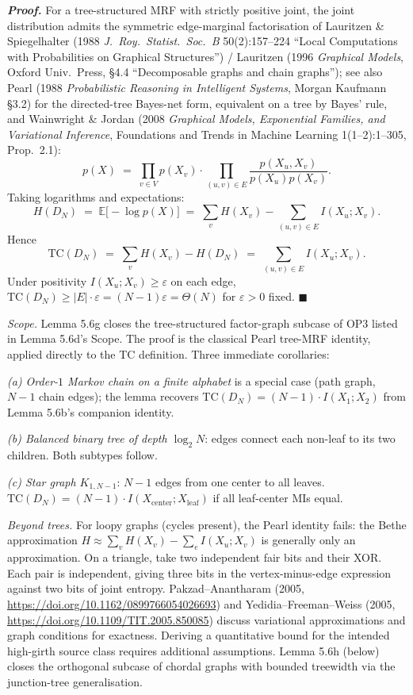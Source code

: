 \documentclass[
]{article}
\begin{document}
\emph{\textbf{Proof.}} For a tree-structured MRF with strictly
positive joint, the joint distribution admits the symmetric
edge-marginal factorisation of Lauritzen \& Spiegelhalter (1988
\emph{J.\ Roy.\ Statist.\ Soc.\ B} 50(2):157--224 ``Local Computations
with Probabilities on Graphical Structures'') / Lauritzen (1996
\emph{Graphical Models}, Oxford Univ.\ Press, §4.4 ``Decomposable
graphs and chain graphs''); see also Pearl (1988
\emph{Probabilistic Reasoning in Intelligent Systems}, Morgan
Kaufmann §3.2) for the directed-tree Bayes-net form, equivalent on
a tree by Bayes' rule, and Wainwright \& Jordan (2008
\emph{Graphical Models, Exponential Families, and Variational
Inference}, Foundations and Trends in Machine Learning
1(1--2):1--305, Prop.\ 2.1):
\[
p(X) \;=\; \prod_{v \in V} p(X_v) \cdot \prod_{(u, v) \in E}
\frac{p(X_u, X_v)}{p(X_u) p(X_v)}.
\]
Taking logarithms and expectations:
\[
H(D_N)
\;=\; \mathbb{E}\bigl[-\log p(X)\bigr]
\;=\; \sum_v H(X_v) - \sum_{(u, v) \in E} I(X_u; X_v).
\]
Hence
\[
\mathrm{TC}(D_N) \;=\; \sum_v H(X_v) - H(D_N)
\;=\; \sum_{(u, v) \in E} I(X_u; X_v).
\]
Under positivity $I(X_u; X_v) \geq \varepsilon$ on each edge,
$\mathrm{TC}(D_N) \geq |E| \cdot \varepsilon = (N - 1) \varepsilon =
\Theta(N)$ for $\varepsilon > 0$ fixed.
\hfill$\blacksquare$

\emph{Scope.} Lemma 5.6g closes the tree-structured factor-graph
subcase of OP3 listed in Lemma 5.6d's Scope. The proof is the
classical Pearl tree-MRF identity, applied directly to the TC
definition. Three immediate corollaries:

\emph{(a) Order-$1$ Markov chain on a finite alphabet} is a special
case (path graph, $N - 1$ chain edges); the lemma recovers
$\mathrm{TC}(D_N) = (N - 1) \cdot I(X_1; X_2)$ from Lemma 5.6b's
companion identity.

\emph{(b) Balanced binary tree of depth $\log_2 N$}: edges connect
each non-leaf to its two children. Both subtypes follow.

\emph{(c) Star graph $K_{1, N-1}$}: $N - 1$ edges from one center
to all leaves. $\mathrm{TC}(D_N) = (N - 1) \cdot I(X_{\mathrm{center}};
X_{\mathrm{leaf}})$ if all leaf-center MIs equal.

\emph{Beyond trees.} For loopy graphs (cycles present), the
Pearl identity fails: the Bethe approximation
$H \approx \sum_v H(X_v) - \sum_e I(X_u; X_v)$ is generally only an approximation. On a triangle, take two
independent fair bits and their XOR. Each pair is independent, giving
three bits in the vertex-minus-edge expression against two bits of
joint entropy. Pakzad--Anantharam (2005,
\url{https://doi.org/10.1162/0899766054026693}) and
Yedidia--Freeman--Weiss (2005,
\url{https://doi.org/10.1109/TIT.2005.850085}) discuss variational
approximations and graph conditions for exactness. Deriving a
quantitative bound for the intended high-girth source class
requires additional assumptions. Lemma 5.6h
(below) closes the orthogonal subcase of chordal graphs with bounded
treewidth via the junction-tree generalisation.
\end{document}
